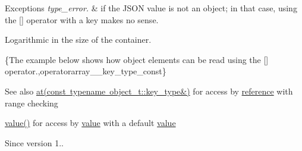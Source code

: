 \begin{DoxyExceptions}{Exceptions}
{\em type\+\_\+error.} & if the J\+S\+ON value is not an object; in that case, using the \mbox{[}\mbox{]} operator with a key makes no sense.\\
\hline
\end{DoxyExceptions}
Logarithmic in the size of the container.

\{The example below shows how object elements can be read using the {\ttfamily \mbox{[}\mbox{]}} operator.,operatorarray\+\_\+\+\_\+key\+\_\+type\+\_\+const\}

\begin{DoxySeeAlso}{See also}
\mbox{\hyperlink{classnlohmann_1_1basic__json_a93403e803947b86f4da2d1fb3345cf2c}{at(const typename object\+\_\+t\+::key\+\_\+type\&)}} for access by \mbox{\hyperlink{classnlohmann_1_1basic__json_ac6a5eddd156c776ac75ff54cfe54a5bc}{reference}} with range checking 

\mbox{\hyperlink{classnlohmann_1_1basic__json_adcf8ca5079f5db993820bf50036bf45d}{value()}} for access by \mbox{\hyperlink{classnlohmann_1_1basic__json_adcf8ca5079f5db993820bf50036bf45d}{value}} with a default \mbox{\hyperlink{classnlohmann_1_1basic__json_adcf8ca5079f5db993820bf50036bf45d}{value}}
\end{DoxySeeAlso}
\begin{DoxySince}{Since}
version 1.. 
\end{DoxySince}
\mbox{\label{classnlohmann_1_1basic__json_abb8eaa633584b5aff9c8fcd242f25ca8}} 
